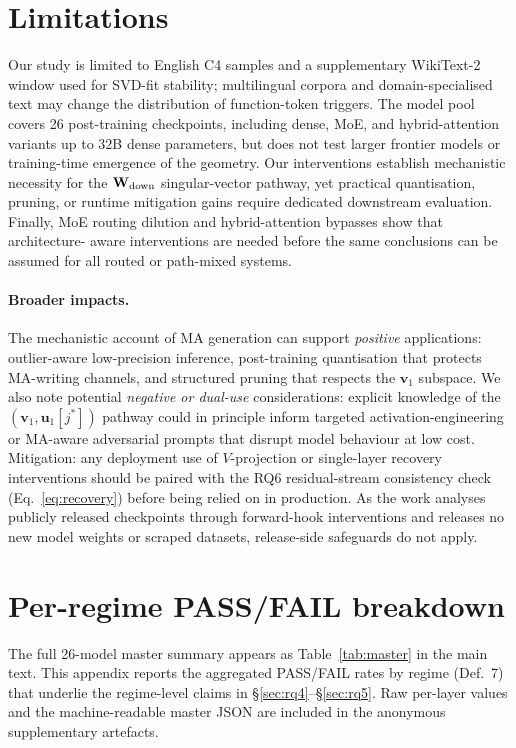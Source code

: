 \section{Limitations}
\label{app:limitations}

Our study is limited to English C4 samples and a supplementary WikiText-2
window used for SVD-fit stability; multilingual corpora and
domain-specialised text may change the distribution of function-token
triggers. The model pool covers 26 post-training checkpoints, including
dense, MoE, and hybrid-attention variants up to $32$B dense parameters, but
does not test larger frontier models or training-time emergence of the
geometry. Our interventions establish mechanistic necessity for the
$\mathbf{W}_{\text{down}}$ singular-vector pathway, yet practical quantisation, pruning, or
runtime mitigation gains require dedicated downstream evaluation. Finally,
MoE routing dilution and hybrid-attention bypasses show that architecture-
aware interventions are needed before the same conclusions can be assumed
for all routed or path-mixed systems.

\paragraph{Broader impacts.}
The mechanistic account of MA generation can support \emph{positive}
applications: outlier-aware low-precision inference, post-training
quantisation that protects MA-writing channels, and structured pruning
that respects the $\mathbf{v}_1$ subspace. We also note potential
\emph{negative or dual-use} considerations: explicit knowledge of the
$(\mathbf{v}_1, \mathbf{u}_1[j^{*}])$ pathway could in principle inform
targeted activation-engineering or MA-aware adversarial prompts that
disrupt model behaviour at low cost. Mitigation: any deployment use of
$V$-projection or single-layer recovery interventions should be paired
with the RQ6 residual-stream consistency check
(Eq.~\eqref{eq:recovery}) before being relied on in production. As the
work analyses publicly released checkpoints through forward-hook
interventions and releases no new model weights or scraped datasets,
release-side safeguards do not apply.

\section{Per-regime PASS/FAIL breakdown}
\label{app:models}

The full 26-model master summary appears as Table~\ref{tab:master} in
the main text. This appendix reports the aggregated PASS/FAIL rates
by regime (Def.~7) that underlie the regime-level claims in
\S\ref{sec:rq4}--\S\ref{sec:rq5}. Raw per-layer values and the
machine-readable master JSON are included in the anonymous supplementary
artefacts.

